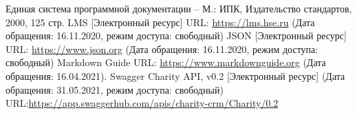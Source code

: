 \documentclass[a4paper,12pt,reqno]{article}
\begin{document}
	\newpage
	
	


						\newpage
	\begin{thebibliography}{3}
		Единая система программной документации – М.: ИПК, Издательство стандартов, 2000, 125 стр.
		LMS [Электронный ресурс] URL: 
		\url{https://lms.hse.ru} (Дата обращения: 16.11.2020, режим доступа: свободный)
		 JSON [Электронный ресурс] URL: \url{https://www.json.org} (Дата обращения: 16.11.2020, режим доступа: свободный)
		 Markdown Guide URL: \url{https://www.markdownguide.org} (Дата обращения: 16.04.2021).
		 Swagger Charity API, v0.2 [Электронный ресурс] (Дата обращения: 31.05.2021, режим доступа: свободный) URL:\url{https://app.swaggerhub.com/apis/charity-crm/Charity/0.2}
	\end{thebibliography}

						\newpage
	\listRegistration
\end{document}
